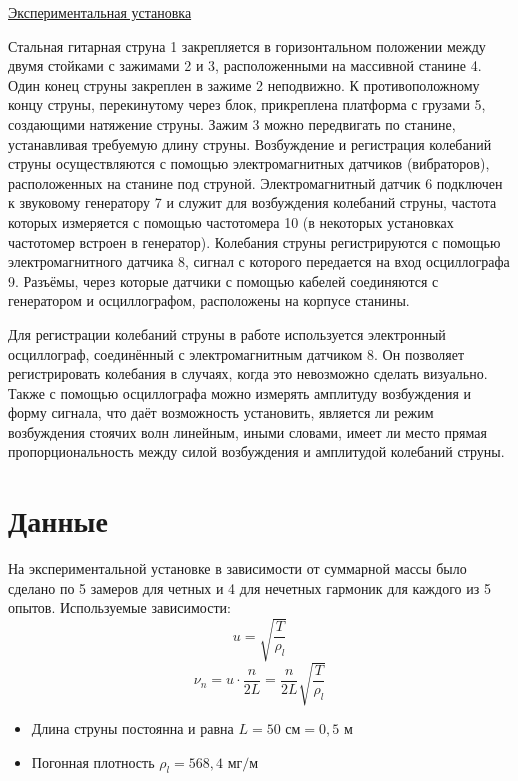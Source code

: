 \documentclass[a4paper]{article}
\begin{document}
\underline{Экспериментальная установка} \newline
\par
Стальная гитарная струна 1 закрепляется в горизонтальном положении между двумя стойками с зажимами 2 и 3, расположенными на массивной станине 4. Один конец струны закреплен в зажиме 2 неподвижно. К противоположному концу струны, перекинутому через блок, прикреплена платформа с грузами 5, создающими натяжение струны. Зажим 3 можно передвигать по станине, устанавливая требуемую длину струны. Возбуждение и регистрация колебаний струны осуществляются с помощью электромагнитных датчиков (вибраторов), расположенных на станине под струной. Электромагнитный датчик 6 подключен к звуковому генератору 7 и служит для возбуждения колебаний струны, частота которых измеряется с помощью частотомера 10 (в некоторых установках частотомер встроен в генератор). Колебания струны регистрируются с помощью электромагнитного датчика 8, сигнал с которого передается на вход осциллографа 9. Разъёмы, через которые датчики с помощью кабелей соединяются с генератором и осциллографом, расположены на корпусе станины.\par

Для регистрации колебаний струны в работе используется электронный осциллограф, соединённый с электромагнитным датчиком 8. Он позволяет регистрировать колебания в случаях, когда это невозможно сделать визуально. Также с помощью осциллографа можно измерять амплитуду возбуждения и форму сигнала, что даёт возможность установить, является ли режим возбуждения стоячих волн линейным, иными словами, имеет ли место прямая пропорциональность между силой возбуждения и амплитудой колебаний струны.
\newpage


\section{Данные}

На экспериментальной установке в зависимости от суммарной массы было сделано по 5 замеров для четных и 4 для нечетных гармоник для каждого из 5 опытов.
Используемые зависимости:
\[u = \sqrt{\frac{T}{\rho_{l}}}\]
\[\nu_{n} = u \cdot \frac{n}{2L} = \frac{n}{2L}\sqrt{\frac{T}{\rho_{l}}}\]


\begin{itemize}
    \item Длина струны постоянна и равна $L = 50 \text{ см} = 0,5 \text{ м}$ 
    \item Погонная плотность $\rho_{l} = 568,4 \text{ мг/м} $
\end{itemize}
\end{document}
